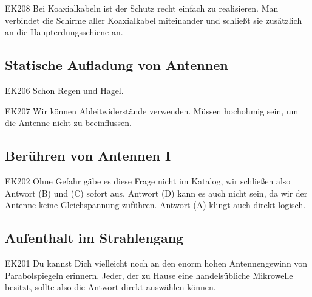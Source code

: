 \begin{sol}{EK208}
Bei Koaxialkabeln ist der Schutz recht einfach zu realisieren. Man verbindet die Schirme aller Koaxialkabel miteinander und schließt sie zusätzlich an die Haupterdungsschiene an.
\end{sol}
\begin{ohmchapter}
\end{ohmchapter}


\subsection{Statische Aufladung von Antennen}

\begin{sol}{EK206}
Schon Regen und Hagel.
\end{sol}

\begin{sol}{EK207}
Wir können Ableitwiderstände verwenden. Müssen hochohmig sein, um die Antenne nicht zu beeinflussen.
\end{sol}


\begin{ohmchapter}
\end{ohmchapter}

\subsection{Berühren von Antennen I}

\begin{sol}{EK202}
 Ohne Gefahr gäbe es diese Frage nicht im Katalog, wir schließen also Antwort (B) und (C) sofort aus.
 Antwort (D) kann es auch nicht sein, da wir der Antenne keine Gleichspannung zuführen. 
 Antwort (A) klingt auch direkt logisch.
\end{sol}


\begin{ohmchapter}
\end{ohmchapter}

\subsection{Aufenthalt im Strahlengang}

\begin{sol}{EK201}
Du kannst Dich vielleicht noch an den enorm hohen Antennengewinn von Parabolspiegeln erinnern.
Jeder, der zu Hause eine handelsübliche Mikrowelle besitzt, sollte also die Antwort direkt auswählen können.
\end{sol}

\begin{ohmchapter}
\end{ohmchapter}